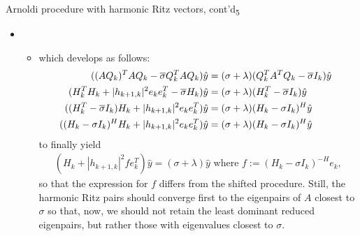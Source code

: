 \documentclass[t,usepdftitle=false]{beamer}
\begin{document}
\begin{frame}{Arnoldi procedure with harmonic Ritz vectors, cont'd\textsubscript{5}}
\begin{itemize}
\item[]
\begin{itemize}\normalsize
\item[] which develops as follows:
\begin{align*}
((AQ_k)^TAQ_k-\overline{\sigma}Q_k^TAQ_k)\hat{y}=&\;(\sigma+\lambda)(Q_k^TA^TQ_k-\overline{\sigma}I_k)\hat{y}\\
(H_k^TH_k+|h_{k+1,k}|^2e_ke_k^T-\overline{\sigma}H_k)\hat{y}=&\;(\sigma+\lambda)(H^T_k-\overline{\sigma}I_k)\hat{y}\\
((H_k^T-\overline{\sigma}I_k)H_k+|h_{k+1,k}|^2e_ke_k^T)\hat{y}=&\;(\sigma+\lambda)(H_k-\sigma I_k)^H\hat{y}\\
\hspace*{-.25cm}
((H_k-\sigma I_k)^HH_k+|h_{k+1,k}|^2e_ke_k^T)\hat{y}=&\;(\sigma+\lambda)(H_k-\sigma I_k)^H\hat{y}
\end{align*}
to finally yield
\begin{align*}
\boxed{(H_k+|h_{k+1,k}|^2fe_k^T)\hat{y}=(\sigma+\lambda)\hat{y}}
\text{ where }
\boxed{f:=(H_k-\sigma I_k)^{-H}e_k},
\end{align*}
so that the expression for $f$ differs from the shifted procedure.
Still, the harmonic Ritz pairs should converge first to the eigenpairs of $A$ closest to $\sigma$ so that, now, we should not retain the least dominant reduced eigenpairs, but rather those with eigenvalues closest to $\sigma$.
\end{itemize}
\end{itemize}
\end{frame}
\end{document}
